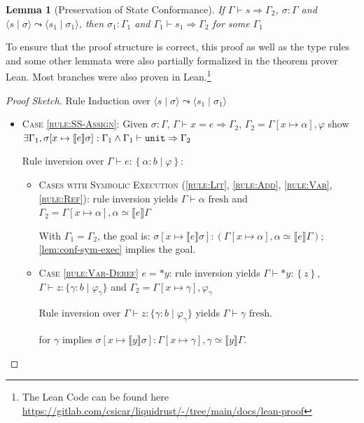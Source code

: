 \documentclass[twoside, english]{sdqthesis}
\newcommand{\tuple}[2]{\langle #1 \mid #2 \rangle}
\newcommand{\set}[1]{\left\{ #1 \right\}}
\newcommand{\bbracket}[1]{\llbracket #1 \rrbracket}
\newtheorem{lemma}[theorem]{Lemma}
\theoremstyle{definition}
\begin{document}
\begin{lemma}[Preservation of State Conformance]\label{lem:preservation-conformance}
  If $\Gamma \vdash s \Rightarrow \Gamma_2$, $\sigma : \Gamma$ and $\tuple{s}{\sigma} \leadsto \tuple{s_1}{\sigma_1}$, then  $\sigma_1 : \Gamma_1$ and $\Gamma_1 \vdash s_1 \Rightarrow \Gamma_2$ for some $\Gamma_1$
\end{lemma}
To ensure that the proof structure is correct, this proof as well as the type rules and some other lemmata were also partially formalized in the theorem prover Lean\cite{de_moura_lean_2015}. Most branches were also proven in Lean.\footnote{The Lean Code can be found here \url{https://gitlab.com/csicar/liquidrust/-/tree/main/docs/lean-proof}}
\begin{proof}[Proof Sketch] Rule Induction over $\tuple{s}{\sigma} \leadsto \tuple{s_1}{\sigma_1}$
  
\begin{itemize}
  \item \textsc{Case \cref{rule:SS-Assign}}:
    Given $\sigma : \Gamma$, $\Gamma \vdash x = e \Rightarrow \Gamma_2$, $\Gamma_2 = \Gamma[x \mapsto \alpha], \varphi$
    show $\exists \Gamma_1, \sigma[ x \mapsto \llbracket e \rrbracket \sigma] : \Gamma_1 \wedge \Gamma_1 \vdash \code{unit} \Rightarrow \Gamma_2 $

    Rule inversion over $\Gamma \vdash e : \set{\alpha : b \mid \varphi }$:
    \begin{itemize}
      \item \textsc{Cases with Symbolic Execution (\cref{rule:Lit}, \cref{rule:Add}, \cref{rule:Var}, \cref{rule:Ref})}: rule inversion yields $\Gamma \vdash \alpha \text{ fresh}$ and $\Gamma_2 = \Gamma[x \mapsto \alpha], \alpha \simeq \bbracket{e}\Gamma$

      With $\Gamma_1 = \Gamma_2$, the goal is: $\sigma[x \mapsto \bbracket{e}\sigma ] : (\Gamma[x \mapsto \alpha], \alpha \simeq \llbracket e \rrbracket \Gamma)$; \cref{lem:conf-sym-exec} implies the goal.
      
      \item \textsc{Case \cref{rule:Var-Deref}} $e = *y$:
        rule inversion yields $\Gamma \vdash *y : \set{z}$, $\Gamma \vdash z : \{\gamma : b \mid \varphi_\gamma\}$ and $\Gamma_2 = \Gamma[x \mapsto \gamma], \varphi_\gamma$

        Rule inversion over $\Gamma \vdash z : \{\gamma : b \mid \varphi_\gamma\}$ yields $\Gamma \vdash \gamma \text{ fresh}$.

         for $\gamma$ implies $\sigma[x \mapsto \bbracket{y}\sigma] : \Gamma[x \mapsto \gamma], \gamma \simeq \bbracket{y}\Gamma$.


\end{itemize}
\end{itemize}
\end{proof}
\end{document}
